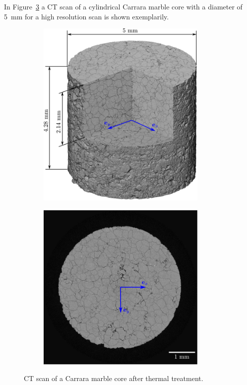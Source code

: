 In Figure~\ref{fig:exampleCarraraMarble} a CT scan of a cylindrical Carrara marble core with a diameter of \SI{5}{\milli\meter} for a high resolution scan is shown exemplarily.
\begin{figure}[ht]
	\centering
    \begin{subfigure}[c]{0.49\textwidth}
    \centering
	\label{fig:exampleCarraraMarble3D}
	\includegraphics[width=0.9\textwidth]{figures/exp_2_2_scan_3d.png}
    \end{subfigure}
    \begin{subfigure}[c]{0.49\textwidth}
    \label{fig:exampleCarraraMarble2D}
	\includegraphics[width=0.9\textwidth]{figures/exp_2_2_scan_2d.png}
\end{subfigure}
\caption{CT scan of a Carrara marble core after thermal treatment.}
\label{fig:exampleCarraraMarble}
\end{figure}

